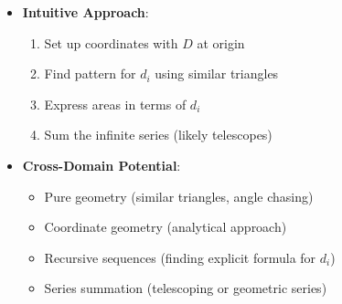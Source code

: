 \documentclass[]{article}
\begin{document}
\begin{problemconfigbox}
\begin{itemize}[leftmargin=*]
    \item \textbf{Intuitive Approach}:
    \begin{enumerate}
        \item Set up coordinates with $D$ at origin
        \item Find pattern for $d_i$ using similar triangles
        \item Express areas in terms of $d_i$
        \item Sum the infinite series (likely telescopes)
    \end{enumerate}
    
    \item \textbf{Cross-Domain Potential}:
    \begin{itemize}
        \item Pure geometry (similar triangles, angle chasing)
        \item Coordinate geometry (analytical approach)
        \item Recursive sequences (finding explicit formula for $d_i$)
        \item Series summation (telescoping or geometric series)
    \end{itemize}
\end{itemize}
\end{problemconfigbox}
\end{document}
